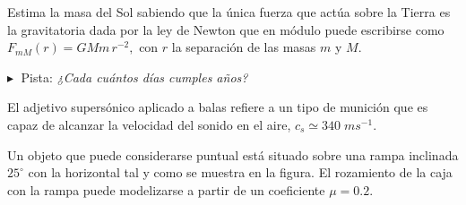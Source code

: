 \documentclass[a4paper,addpoints,14pt]{exam}
\begin{document}
\begin{questions}

\question[2] Estima la masa del Sol sabiendo que la única fuerza que actúa sobre la Tierra es la gravitatoria dada por la ley de Newton que en módulo puede escribirse como $F_{mM}(r)=GMm\,r^{-2},$ con $r$ la separación de las masas $m$ y $M$.
	\vspace{.5ex}
	
	{\small $\blacktriangleright\;$ Pista:\;\; \textit{¿Cada cuántos días cumples años?}	
	}


	

\boxedpoints

	\question El adjetivo supersónico aplicado a balas refiere a un tipo de munición que es capaz de alcanzar la velocidad del sonido en el aire, $c_s\simeq 340\;ms^{-1}$. 


\vspace{5ex}

\question 
\begin{minipage}{10cm}
	Un objeto que puede considerarse puntual está situado sobre una rampa inclinada $25^\circ$ con la horizontal tal y como se muestra en la figura. El rozamiento de la caja con la rampa puede modelizarse a partir de un  coeficiente $\mu=0.2$.


\end{minipage}
\end{questions}
\end{document}
